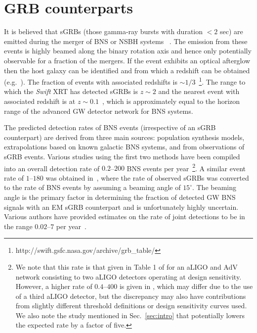 \documentclass[prd, twocolumn, lengthcheck, superscriptaddress, showpacs, letterpaper, nofootinbib]{revtex4-1}
\begin{document}
\section{GRB counterparts\label{sec:GRB}}

It is believed that \acp{sGRB} (those gamma-ray bursts with duration ${<}2$ sec) are
emitted during the merger of \ac{BNS} or \ac{NSBH} systems
~\cite{1989Natur.340..126E,1992ApJ...395L..83N}. The emission from these events
is highly beamed along the binary rotation axis and hence only potentially
observable for a fraction of the mergers. If the event exhibits an optical
afterglow then the host galaxy can be identified and from which a redshift can
be obtained (e.g.~\cite{2005Natur.437..851G}).  The fraction of events with
associated redshifts is
${\sim}1/3$~\footnote{http://swift.gsfc.nasa.gov/archive/grb\_table/}.
The range to which the \emph{Swift} \ac{XRT} has detected \acp{sGRB} is
$z{\sim}2$ and the nearest event with associated redshift is at
$z{\sim}0.1$~\cite{2015GCN..17278...1C}, which is approximately equal to the
horizon range of the advanced \ac{GW} detector network for \ac{BNS} systems. 

The predicted detection rates of \ac{BNS} events (irrespective of an \ac{sGRB}
counterpart) are derived from three main sources: population
synthesis models, extrapolations based on known galactic \ac{BNS} systems, and
from observations of \ac{sGRB} events. Various studies using the first two
methods have been compiled into an overall detection rate of $0.2$--$200$
\ac{BNS} events per
year~\cite{2013arXiv1304.0670L,2010CQGra..27q3001A}\footnote{We note that this
rate is that given in Table 1 of \cite{2013arXiv1304.0670L} for an \ac{aLIGO}
and \ac{AdV} network consisting to two \ac{aLIGO} detectors operating at design
sensitivity. However, a higher rate of $0.4$--$400$ is given in
\cite{2010CQGra..27q3001A}, which may differ due to the use of a third
\ac{aLIGO} detector, but the discrepancy may also have contributions from
slightly different threshold definitions or design sensitivity curves used. We
also note the study mentioned in Sec.~\ref{sec:intro} that potentially lowers
the expected rate by a factor of five.}. A similar event rate of
$1$--$180$ was obtained in~\cite{2012MNRAS.425.2668C}, where the rate of
observed \acp{sGRB} was converted to the rate of \ac{BNS} events by assuming a
beaming angle of $15^{\circ}$. The beaming angle is the primary factor in
determining the fraction of detected \ac{GW} \ac{BNS} signals with an \ac{EM}
\ac{sGRB} counterpart and is unfortunately highly uncertain.  Various authors
have provided estimates on the rate of joint detections to be in the range
$0.02$--$7$ per
year~\cite{2013PhRvL.111r1101C,Kelley:2012fl,2014arXiv1405.2254S,2015MNRAS.448.3026W}.  
\end{document}
